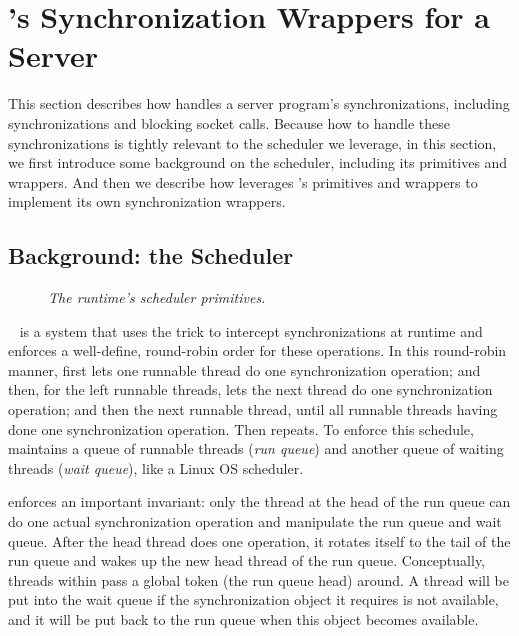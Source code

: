 \section{\xxx's Synchronization Wrappers for a Server} \label{sec:wrappers}

This section describes how \xxx handles a server program's 
synchronizations, including \pthread synchronizations and blocking socket 
calls. Because how to handle these synchronizations is tightly relevant 
to the \parrot \dmt scheduler we leverage, in this section, we first introduce 
some background on the \parrot scheduler, including its primitives and wrappers. 
And then we describe how \xxx leverages \parrot's primitives and wrappers to 
implement its own synchronization wrappers.

\subsection{Background: the \parrot Scheduler} \label{sec:parrot}

\begin{figure}[t]
\centering
\begin{minipage}{.5\textwidth}
\end{minipage}
\vspace{-.1in}
\caption{{\em The \parrot \dmt runtime's scheduler primitives.}} 
\label{fig:dmt-primitives}
\vspace{-.05in}
\end{figure}

\parrot~\cite{parrot:sosp13} is a \dmt system that uses the \ldpreload trick to 
intercept \pthread synchronizations at runtime and enforces a 
well-define, round-robin order for these operations. In this round-robin 
manner, \parrot first lets one runnable thread do one synchronization 
operation; and then, for the left runnable threads, \parrot lets the next 
thread do one synchronization operation; and then the next runnable thread, 
until all runnable threads having done one synchronization operation. Then 
\parrot repeats. To enforce this schedule, \parrot maintains a queue of runnable 
threads (\emph{run queue}) and another queue of waiting threads (\emph{wait 
queue}), like a Linux OS scheduler.

\parrot enforces an important invariant: only the thread at the head of the run 
queue can do one actual synchronization operation and manipulate the run queue 
and wait queue. After the head thread does one operation, it rotates itself 
to the tail of the run queue and wakes up the new head thread of the run queue. 
Conceptually, threads within \parrot pass a global token (the run queue head) 
around. A thread will be put into the wait queue if the synchronization object 
it requires is not available, and it will be put back to the run queue 
when this object becomes available.

